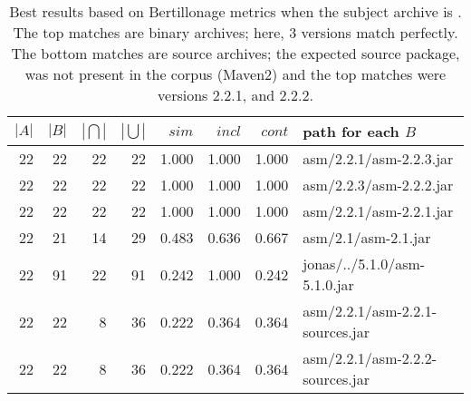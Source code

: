 \begin{table}[htbp]
\small
  \centering
  \begin{tabular}{r|r|r|r|r|r|r|l}
 $|A|$ & $|B|$&$|\bigcap |$ & $| \bigcup |$ & $sim$  &
 $incl$& $cont$ & path for each $B$ \\
\hline
  22 &   22 &            22 &        22 &  1.000  &  1.000    &  1.000    & asm/2.2.1/asm-2.2.3.jar\\
  22 &   22 &            22 &        22 &  1.000  &  1.000    &  1.000    & asm/2.2.3/asm-2.2.2.jar\\
  22 &   22 &            22 &        22 &  1.000  &  1.000    &  1.000    & asm/2.2.1/asm-2.2.1.jar\\
  22 &   21 &            14 &        29 &  0.483  &  0.636    &  0.667    & asm/2.1/asm-2.1.jar\\
  22 &   91 &            22 &        91 &  0.242  &  1.000    &  0.242    & jonas/../5.1.0/asm-5.1.0.jar\\
\hline
  22 &   22 &             8 &        36 &  0.222  &  0.364    &  0.364    & asm/2.2.1/asm-2.2.1-sources.jar\\
  22 &   22 &             8 &        36 &  0.222  &  0.364    &  0.364    & asm/2.2.1/asm-2.2.2-sources.jar\\
  \end{tabular}
  \vspace{1mm}
  \caption{Best results based on Bertillonage metrics when the
    subject archive  is . The top matches are binary
    archives; here, 3 versions match perfectly. The bottom matches are
    source archives; the expected source package,
     was not present in the corpus (Maven2) and
    the top matches were versions 2.2.1, and 2.2.2.} 
  \label{tab:metricsExample}
\end{table}


